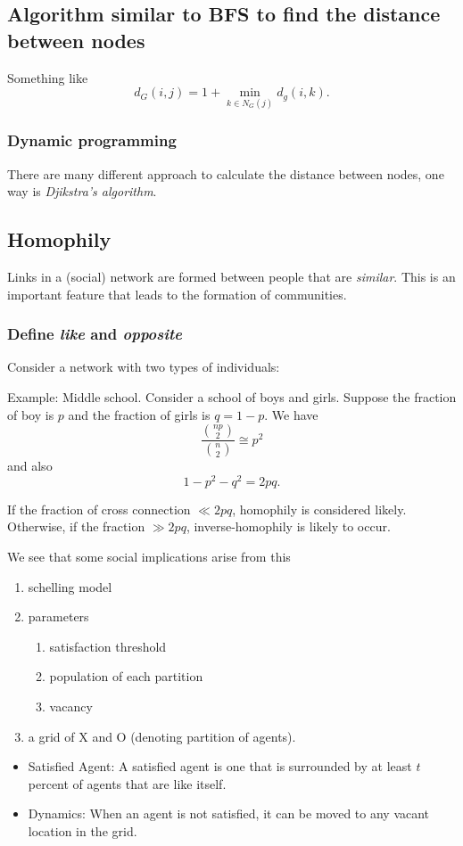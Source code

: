 \subsection{Algorithm similar to BFS to find the distance between nodes}
Something like
\[
	d_G(i, j) = 1 + \min_{k\in N_G(j)} d_g(i, k).
\]

\subsubsection{Dynamic programming}
There are many different approach to calculate the distance between nodes, one way is \emph{Djikstra's algorithm}.

\subsection{Homophily}
Links in a (social) network are formed between people that are \emph{similar}. This is an important feature that leads to
the formation of communities.

\subsubsection{Define \emph{like} and \emph{opposite}}
Consider a network with two types of individuals:
\begin{eg}
	Example: Middle school. Consider a school of boys and girls. Suppose the fraction of boy is $p$ and the fraction of girls is $q = 1 - p$. We have
	\[
		\frac{\binom{np}{2}}{\binom{n}{2}} \cong p^2
	\]
	and also
	\[
		1 - p^2 - q^2 = 2pq.
	\]

	If the fraction of cross connection $\ll 2pq$, homophily is considered likely. Otherwise, if the fraction $\gg 2pq$, inverse-homophily is likely to occur.
\end{eg}

We see that some social implications arise from this
\begin{enumerate}
	\item schelling model
	\item parameters
	      \begin{enumerate}
		      \item satisfaction threshold
		      \item population of each partition
		      \item vacancy
	      \end{enumerate}
	\item a grid of X and O (denoting partition of agents).
\end{enumerate}

\begin{itemize}
	\item Satisfied Agent: A satisfied agent is one that is surrounded by at least \(t\) percent of agents that are like itself.
	\item Dynamics: When an agent is not satisfied, it can be moved to any vacant location in the grid.
\end{itemize}

